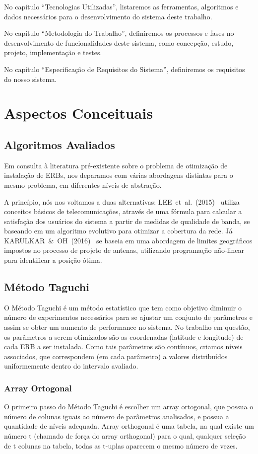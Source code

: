 \documentclass[]{politex}
\begin{document}
No capítulo ``Tecnologias Utilizadas'', listaremos as ferramentas, algoritmos
e dados necessários para o desenvolvimento do sistema deste trabalho.

No capítulo ``Metodologia do Trabalho'', definiremos os processos e fases
no desenvolvimento de funcionalidades deste sistema, como concepção, estudo,
projeto, implementação e testes.

No capítulo ``Especificação de Requisitos do Sistema'', definiremos os
requisitos do nosso sistema.


\chapter{Aspectos Conceituais}

\section{Algoritmos Avaliados}
Em consulta à literatura pré-existente sobre o problema de otimização de
instalação de ERBs, nos deparamos com várias abordagens distintas para o mesmo
problema, em diferentes níveis de abstração.

A princípio, nós nos voltamos a duas alternativas: LEE~et~al.~(2015)~
\cite{evolutivo} utiliza conceitos básicos de telecomunicações, através de uma
fórmula para calcular a satisfação dos usuários do sistema a partir de medidas
de qualidade de banda, se baseando em um algoritmo evolutivo para otimizar
a cobertura da rede. Já KARULKAR~\&~OH~(2016)~\cite{nao-linear} se baseia em
uma abordagem de limites geográficos impostos no processo de projeto de antenas,
utilizando programação não-linear para identificar a posição ótima.

\section{Método Taguchi}
O Método Taguchi é um método estatístico que tem como objetivo diminuir o número
de experimentos necessários para se ajustar um conjunto de parâmetros e assim
se obter um aumento de performance no sistema. No trabalho em questão, os
parâmetros a serem otimizados são as coordenadas (latitude e longitude) de cada
ERB a ser instalada. Como tais parâmetros são contínuos, criamos níveis
associados, que correspondem (em cada parâmetro) a valores distribuídos
uniformemente dentro do intervalo avaliado.
\subsection{Array Ortogonal}
O primeiro passo do Método Taguchi é escolher um array ortogonal, que possua o 
número de colunas iguais ao número de parâmetros analisados, e possua a
quantidade de níveis adequada. Array orthogonal é uma tabela, na qual existe um 
número t (chamado de força do array orthogonal) para o qual, qualquer seleção de
t colunas na tabela, todas as t-uplas aparecem o mesmo número de vezes.
\end{document}
